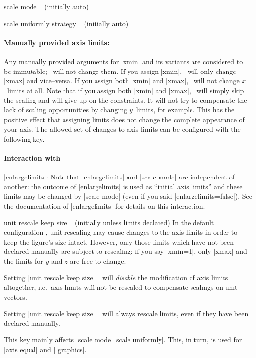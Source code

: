 \begin{pgfplotskey}{scale mode= (initially auto)}
\begin{pgfplotskey}{scale uniformly strategy= (initially auto)}
	\end{pgfplotskey}

	\paragraph{Manually provided axis limits:} Any manually provided arguments for |xmin| and its variants are considered to be immutable; \PGFPlots\ will not change them. If you assign |xmin|, \PGFPlots\ will only change |xmax| and vice--versa. If you assign both |xmin| and |xmax|, \PGFPlots\ will not change $x$~limits at all. Note that if you assign both |xmin| and |xmax|, \PGFPlots\ will simply skip the scaling and will give up on the constraints. It will not try to compensate the lack of scaling opportunities by changing $y$~limits, for example. This has the positive effect that assigning limits does not change the complete appearance of your axis.  The allowed set of changes to axis limits can be configured with the following key.

	\paragraph{Interaction with }|enlargelimits|: Note that |enlargelimits| and |scale mode| are independent of another: the outcome of |enlargelimits| is used as ``initial axis limits'' and these limits may be changed by |scale mode| (even if you said |enlargelimits=false|). See the documentation of |enlargelimits| for details on this interaction.

	\begin{pgfplotskey}{unit rescale keep size= (initially unless limits declared)}
		In the default configuration , unit rescaling may cause changes to the axis limits in order to keep the figure's size intact. However, only those limits which have not been declared manually are subject to rescaling: if you say |xmin=1|, only |xmax| and the limits for $y$ and $z$ are free to change.

		Setting |unit rescale keep size=| will \emph{disable} the modification of axis limits altogether, i.e.\ axis limits will not be rescaled to compensate scalings on unit vectors.

		Setting |unit rescale keep size=| will always rescale limits, even if they have been declared manually.
		
		This key mainly affects |scale mode=scale uniformly|. This, in turn, is used for |axis equal| and | graphics|.


\end{pgfplotskey}
\end{pgfplotskey}
